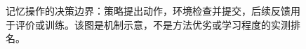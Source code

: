 \begin{figure}[htbp]
\centering

\caption{记忆操作的决策边界：策略提出动作，环境检查并提交，后续反馈用于评价或训练。该图是机制示意，不是方法优劣或学习程度的实测排名。}
\label{fig:ch06-ladder}
\end{figure}

